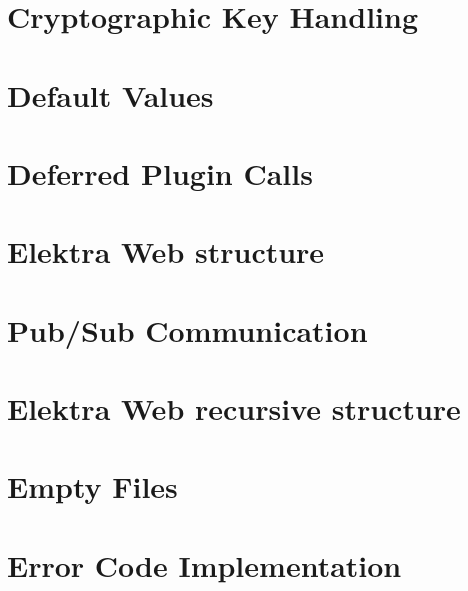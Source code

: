 \documentclass[twoside]{book}
\newcommand{\+}{\discretionary{\mbox{\scriptsize$\hookleftarrow$}}{}{}}
\begin{document}
\chapter{Cryptographic Key Handling}
\label{doc_decisions_cryptograhic_key_handling_md}

\chapter{Default Values}
\label{doc_decisions_default_values_md}

\chapter{Deferred Plugin Calls}
\label{doc_decisions_deferred_plugin_calls_md}

\chapter{Elektra Web structure}
\label{doc_decisions_elektra_web_md}

\chapter{Pub/\+Sub Communication}
\label{doc_decisions_elektra_web_pubsub_md}

\chapter{Elektra Web recursive structure}
\label{doc_decisions_elektra_web_recursive_md}

\chapter{Empty Files}
\label{doc_decisions_empty_files_md}

\chapter{Error Code Implementation}
\label{doc_decisions_error_code_implementation_md}

\end{document}
